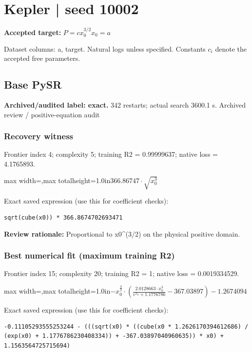 \documentclass[10pt,letterpaper,landscape]{article}
\begin{document}
\section*{Kepler | seed 10002}
\textbf{Accepted target:} $\displaystyle P=c x_0^{3/2}$\hfill $x_0=a$\par
{\small Dataset columns: a, target. Natural logs unless specified. Constants $c_i$ denote the accepted free parameters.}\par\medskip
\begin{minipage}[t]{0.485\textwidth}
\subsection*{Base PySR}
\textbf{Archived/audited label: exact.} 342 restarts; actual search 3600.1 s.
{\small Archived review / positive-equation audit}
\subsubsection*{Recovery witness}
Frontier index 4; complexity 5; training R2 = 0.99999637; native loss = 4.1765893.
\begin{center}\begin{adjustbox}{max width=\linewidth,max totalheight=1.0in}$\displaystyle 366.86747 \cdot \sqrt{x_{0}^{3}}$\end{adjustbox}\end{center}
{\scriptsize Exact saved expression (use this for coefficient checks):}
\begin{lstlisting}
sqrt(cube(x0)) * 366.8674702693471
\end{lstlisting}
{\small\textbf{Review rationale:} Proportional to x0\textasciicircum{}(3/2) on the physical positive domain.}
\subsubsection*{Best numerical fit (maximum training R2)}
Frontier index 15; complexity 20; training R2 = 1; native loss = 0.0019334529.
\begin{center}\begin{adjustbox}{max width=\linewidth,max totalheight=1.0in}$\displaystyle - x_{0}^{\frac{3}{2}} \cdot \left(\frac{2.0128663 \cdot x_{0}^{3}}{e^{x_{0}} + 1.1776786} - 367.03897\right) - 1.2674094$\end{adjustbox}\end{center}
{\scriptsize Exact saved expression (use this for coefficient checks):}
\begin{lstlisting}
-0.11105293555253244 - (((sqrt(x0) * ((cube(x0 * 1.2626170394612686) / (exp(x0) + 1.1776786230408334)) + -367.03897040960635)) * x0) + 1.1563564725715694)
\end{lstlisting}
\end{minipage}\hfill
\end{document}

